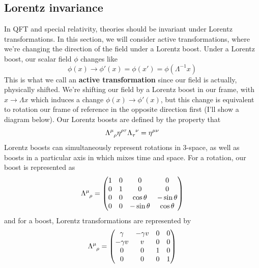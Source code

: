 \documentclass[11pt, oneside]{article}   	%
\theoremstyle{newline}
\theoremstyle{newline}
\theoremstyle{newline}
\theoremstyle{newline}
\theoremstyle{newline}
\begin{document}
\subsection{Lorentz invariance} 
In QFT and special relativity, theories should be invariant under Lorentz transformations. In this section, we will consider active transformations, where we're changing the direction of the field under a Lorentz boost. Under a Lorentz boost, our scalar field $\phi$ changes like 
\[
\phi(x) \rightarrow \phi'(x)  = \phi (x')  = \phi(\Lambda^{ - 1} x ) 
\] 
This is what we call an \textbf{active transformation} since our field is actually, physically shifted.
We're shifting our field by a Lorentz boost in our frame, with $x \rightarrow \Lambda x  $ which induces a change $\phi(x) \rightarrow \phi' (x)$, but this change is equivalent to rotation our frame of reference in the opposite direction first (I'll show a diagram below). 
Our Lorentz boosts are defined by the property that 
\[
\Lambda\indices{^\mu_\rho} \eta^{\rho \tau} \Lambda \indices{_\tau^\nu} = \eta^{ \mu \nu } 
\] 
Lorentz boosts can simultaneously represent rotations in 3-space, as well as boosts in a particular axis in which mixes time and space. For a rotation, our boost is represented as 
\[ 
\Lambda\indices{^\mu_\rho} = \begin{pmatrix} 
1 & 0 & 0 & 0 \\
0 & 1 & 0 & 0 \\
0 & 0 & \cos \theta &  - \sin \theta \\
0 & 0 & - \sin \theta & \cos \theta 
\end{pmatrix} 
\]  
and for a boost, Lorentz transformations are represented by 
\[ 
\Lambda\indices{^\mu_\rho}  = \begin{pmatrix} 
\gamma &  - \gamma v & 0 & 0 \\
- \gamma v & v & 0 & 0 \\
0 & 0 & 1 & 0 \\
0 & 0 & 0 & 1 
\end{pmatrix} 
\] 
\end{document}
